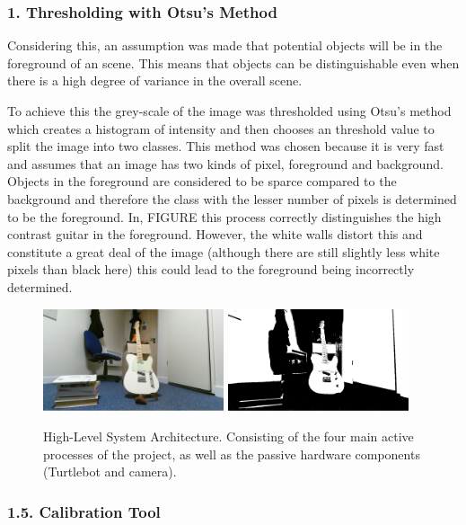 \documentclass{mproj}
\begin{document}
\subsubsection{1. Thresholding with Otsu's Method}

Considering this, an assumption was made that potential objects will be in the foreground of an scene. This means that objects can be distinguishable even when there is a high degree of variance in the overall scene. 

To achieve this the grey-scale of the image was thresholded using Otsu's method which creates a histogram of intensity and then chooses an  threshold value to split the image into two classes. This method was chosen because it is very fast and assumes that an image has two kinds of pixel, foreground and background\cite{otsu}. Objects in the foreground are considered to be sparce compared to the background and therefore the class with the lesser number of pixels is determined to be the foreground. In, FIGURE this process correctly distinguishes the high contrast guitar in the foreground. However, the white walls distort this and constitute a great deal of the image (although there are still slightly less white pixels than black here) this could lead to the foreground being incorrectly determined.

\begin{figure}
   \caption{High-Level System Architecture. Consisting of the four main active processes of the project, as well as the passive hardware components (Turtlebot and camera).}
   \centering
   \includegraphics[width=0.475\textwidth]{images/basic.png}
   \hfill
   \includegraphics[width=0.475\textwidth]{images/otsu.png}
\end{figure}

\subsubsection{1.5. Calibration Tool}
\end{document}
